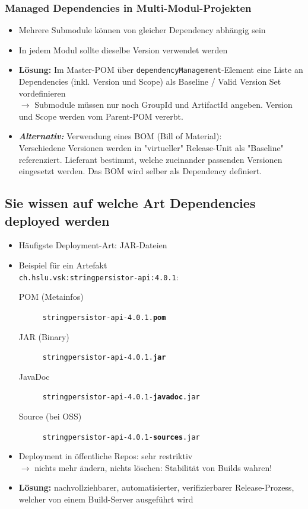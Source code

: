 \documentclass[a4paper]{article}
\begin{document}
		\subsubsection{Managed Dependencies in Multi-Modul-Projekten}
		
		\begin{itemize}
			\item Mehrere Submodule können von gleicher Dependency abhängig sein
			\item In jedem Modul sollte dieselbe Version verwendet werden
			\item \textbf{Lösung:} Im Master-POM über \texttt{dependencyManagement}-Element eine Liste an Dependencies (inkl. Version und Scope) als Baseline / Valid Version Set vordefinieren\\
			$\rightarrow$ Submodule müssen nur noch GroupId und ArtifactId angeben.
			Version und Scope werden vom Parent-POM vererbt.
			\item \textbf{\textit{Alternativ:}} Verwendung eines BOM (Bill of Material):\\
			Verschiedene Versionen werden in "virtueller" Release-Unit als "Baseline" referenziert.
			Lieferant bestimmt, welche zueinander passenden Versionen eingesetzt werden.
			Das BOM wird selber als Dependency definiert.
		\end{itemize}
	
	\subsection{Sie wissen auf welche Art Dependencies deployed werden}

	\begin{itemize}
		\item Häufigste Deployment-Art: JAR-Dateien
		\item Beispiel für ein Artefakt\\
				\texttt{ch.hslu.vsk:stringpersistor-api:4.0.1}:
			\begin{description}
				\item[POM (Metainfos)] \texttt{stringpersistor-api-4.0.1.\textbf{pom}}
				\item[JAR (Binary)] \texttt{stringpersistor-api-4.0.1.\textbf{jar}}
				\item[JavaDoc] \texttt{stringpersistor-api-4.0.1-\textbf{javadoc}.jar}
				\item[Source (bei OSS)] \texttt{stringpersistor-api-4.0.1-\textbf{sources}.jar}\\
			\end{description}
		
		\item Deployment in öffentliche Repos: sehr restriktiv\\
				$\rightarrow$ nichts mehr ändern, nichts löschen: Stabilität von Builds wahren!
		
		\item \textbf{Lösung:} nachvollziehbarer, automatisierter, verifizierbarer Release-Prozess, welcher von einem Build-Server ausgeführt wird
	\end{itemize}
	
\end{document}
